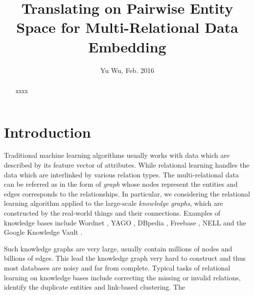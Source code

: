 \documentclass[10pt,journal]{IEEEtran}
\begin{document}
\title{Translating on Pairwise Entity Space for Multi-Relational Data Embedding}
\author{ Yu Wu, Feb. 2016
             }
\maketitle

\begin{abstract}
xxxx
\end{abstract}

\section{Introduction}
Traditional machine learning algorithms usually works with data  which are described by its feature vector of attributes. While relational learning handles the data which are interlinked by various relation types. The multi-relational data can be referred as in the form of \emph{graph} whose nodes represent the entities and edges corresponds to the relationships. In particular, we considering the relational learning algorithm applied to the large-scale \emph{knowledge graphs}, which are constructed by the real-world things and their connections.  Examples of knowledge bases include Wordnet \cite{miller_wordnet:_1995}, YAGO \cite{suchanek_yago:_2007}, DBpedia \cite{lehmann_dbpedialarge-scale_2015}, Freebase \cite{bollacker_freebase:_2008}, NELL \cite{betteridge_toward_2009} and the Google Knowledge Vault \cite{dong_knowledge_2014}.  

Such knowledge graphs are very large, usually contain millions of nodes and billions of edges. This lead the knowledge graph very hard to construct and thus most databases are noisy and far from complete. Typical tasks of relational learning on knowledge bases include correcting the missing or invalid relations, identify the duplicate entities and link-based clustering. The 
\end{document}
